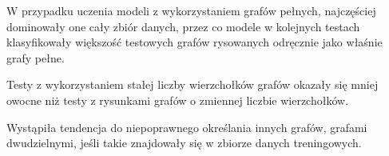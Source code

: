 W przypadku uczenia modeli z wykorzystaniem grafów pełnych, najczęściej dominowały one cały zbiór danych,
przez co modele w kolejnych testach klasyfikowały większość testowych grafów rysowanych odręcznie jako właśnie grafy pełne.

Testy z wykorzystaniem stałej liczby wierzchołków grafów okazały się mniej owocne niż testy z rysunkami grafów
o zmiennej liczbie wierzchołków.

Wystąpiła tendencja do niepoprawnego określania innych grafów, grafami dwudzielnymi, jeśli takie znajdowały się
w zbiorze danych treningowych.